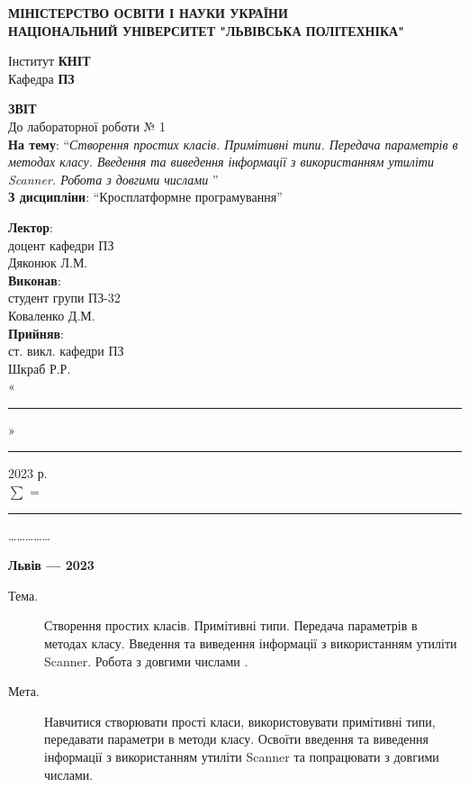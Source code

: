 \documentclass[14pt]{extreport}
\newcommand\subject{Кросплатформне програмування}
\newcommand\lecturer{доцент кафедри ПЗ\\Дяконюк Л.М.}
\newcommand\teacher{ст. викл. кафедри ПЗ\\Шкраб Р.Р.}
\newcommand\mygroup{ПЗ-32}
\newcommand\lab{1}
\newcommand\theme{Створення простих класів. Примітивні типи. Передача параметрів
	в методах класу. Введення та виведення інформації з використанням
	утиліти Scanner. Робота з довгими числами
}
\newcommand\purpose{Навчитися створювати прості класи, використовувати примітивні типи, передавати параметри в методи класу. Освоїти введення та виведення інформації з використанням утиліти Scanner та попрацювати з довгими числами}
\begin{document}
\begin{normalsize}
	\begin{titlepage}
		\thispagestyle{empty}
		\begin{center}
			\textbf{МІНІСТЕРСТВО ОСВІТИ І НАУКИ УКРАЇНИ\\
				НАЦІОНАЛЬНИЙ УНІВЕРСИТЕТ "ЛЬВІВСЬКА ПОЛІТЕХНІКА"}
		\end{center}
		\begin{flushright}
			Інститут \textbf{КНІТ}\\
			Кафедра \textbf{ПЗ}
		\end{flushright}
		\vspace{160pt}
		\begin{center}
			\textbf{ЗВІТ}\\
			\vspace{10pt}
			До лабораторної роботи № \lab\\
			\textbf{На тему}: “\textit{\theme}”\\
			\textbf{З дисципліни}: “\subject”
		\end{center}
		\vspace{40pt}
		\begin{flushright}
			
			\textbf{Лектор}:\\
			\lecturer\\
			\vspace{10pt}
			\textbf{Виконав}:\\
			
			студент групи \mygroup\\
			Коваленко Д.М.\\
			\vspace{10pt}
			\textbf{Прийняв}:\\
			
			\teacher\\
			
			\vspace{28pt}
			«\rule{1cm}{0.15mm}» \rule{1.5cm}{0.15mm} 2023 р.\\
			$\sum$ = \rule{1cm}{0.15mm}……………\\
			
		\end{flushright}
		\vspace{\fill}
		\begin{center}
			\textbf{Львів — 2023}
		\end{center}
	\end{titlepage}
		
	\begin{description}
		\item[Тема.] \theme.
		\item[Мета.] \purpose.
	\end{description}
	

\end{normalsize}
\end{document}
